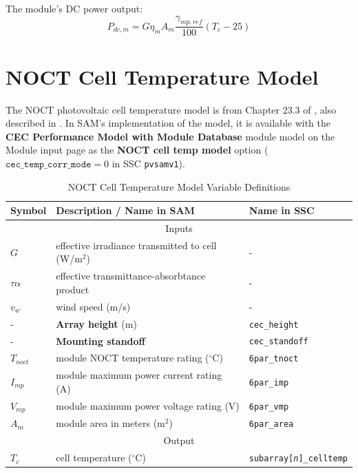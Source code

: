 \documentclass[12pt,letterpaper]{article}
\begin{document}
The module's DC power output:
\begin{equation}
P_{dc,m} = G \eta_m A_m \frac{\gamma_{mp,ref}}{100} (T_c - 25)
\end{equation}

\section{NOCT Cell Temperature Model} \label{sec-tcnoct}

The NOCT photovoltaic cell temperature model is from Chapter 23.3 of \citet{duffie2013}, also described in \citet{desoto2004b}. In SAM's implementation of the model, it is available with the \textbf{CEC Performance Model with Module Database} module model on the Module input page as the \textbf{NOCT cell temp model} option ($\mathtt{cec\_temp\_corr\_mode}=0$ in SSC \texttt{pvsamv1}).

\begin{table}
\begin{center}
\caption{NOCT Cell Temperature Model Variable Definitions}
\begin{tabular}{lll}
\midrule
Symbol & Description / \textbf{Name in SAM} & Name in SSC \\
\midrule
\multicolumn{3}{c}{Inputs}\\
$G$ & effective irradiance transmitted to cell (W/m$^2$)& - \\
$\tau \alpha$ & effective transmittance-absorbtance product & - \\
$v_{w}$ & wind speed (m/s) & - \\
- & \textbf{Array height} (m)& \texttt{cec\_height} \\
- & \textbf{Mounting standoff} & \texttt{cec\_standoff} \\
$T_{noct}$ & module NOCT temperature rating ($^\circ$C)& \texttt{6par\_tnoct} \\
$I_{mp}$ & module maximum power current rating (A)& \texttt{6par\_imp} \\
$V_{mp}$ & module maximum power voltage rating (V) & \texttt{6par\_vmp} \\
$A_m$ & module area in meters (m$^2$)& \texttt{6par\_area} \\
\midrule
\multicolumn{3}{c}{Output}\\
$T_c$ & cell temperature ($^\circ$C)& \texttt{subarray[\textit{n}]\_celltemp} \\
\hline
\end{tabular}
\label{tab-tempnoct}
\end{center}
\end{table}
\end{document}
